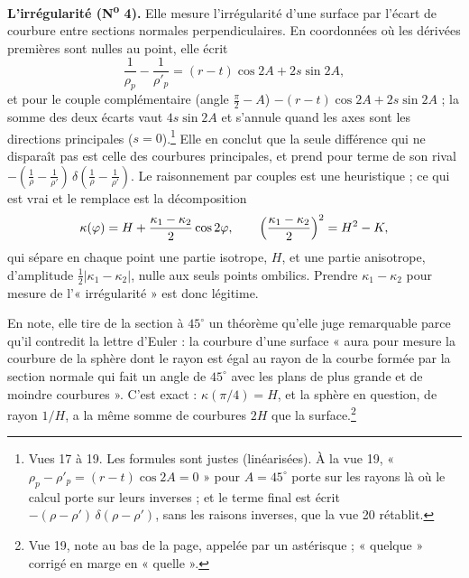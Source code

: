 \documentclass[11pt,a4paper]{article}
\begin{document}
\textbf{L'irrégularité (N\textsuperscript{o} 4).} Elle mesure l'irrégularité
d'une surface par l'écart de courbure entre sections normales perpendiculaires.
En coordonnées où les dérivées premières sont nulles au point, elle écrit
\[
\frac{1}{\rho_p} - \frac{1}{\rho'_p} = (r-t)\cos 2A + 2s\sin 2A ,
\]
et pour le couple complémentaire (angle $\frac\pi2 - A$) $-(r-t)\cos 2A + 2s\sin
2A$ ; la somme des deux écarts vaut $4s\sin 2A$ et s'annule quand les axes
sont les directions principales ($s = 0$).\footnote{Vues 17 à 19. Les formules
sont justes (linéarisées). À la vue 19, « $\rho_p - \rho'_p = (r-t)\cos 2A = 0$ »
pour $A = 45^\circ$ porte sur les rayons là où le calcul porte sur leurs
inverses ; et le terme final est écrit $-(\rho-\rho')\,\delta(\rho-\rho')$, sans
les raisons inverses, que la vue 20 rétablit.} Elle en conclut que la seule
différence qui ne disparaît pas est celle des courbures principales, et prend
pour terme de son rival $-(\frac1\rho - \frac1{\rho'})\,\delta(\frac1\rho -
\frac1{\rho'})$. Le raisonnement par couples est une heuristique ; ce qui est
vrai et le remplace est la décomposition
\[
\kappa(\varphi) = H + \frac{\kappa_1 - \kappa_2}{2}\cos 2\varphi ,
\qquad
\Bigl(\frac{\kappa_1-\kappa_2}{2}\Bigr)^2 = H^2 - K ,
\]
qui sépare en chaque point une partie isotrope, $H$, et une partie
anisotrope, d'amplitude $\frac12|\kappa_1-\kappa_2|$, nulle aux seuls points
ombilics. Prendre $\kappa_1 - \kappa_2$ pour mesure de l'« irrégularité » est
donc légitime.

En note, elle tire de la section à $45^\circ$ un théorème qu'elle juge
remarquable parce qu'il contredit la lettre d'Euler : la courbure d'une surface
« aura pour mesure la courbure de la sphère dont le rayon est égal au rayon de
la courbe formée par la section normale qui fait un angle de $45^\circ$ avec
les plans de plus grande et de moindre courbures ». C'est exact : $\kappa(\pi/4)
= H$, et la sphère en question, de rayon $1/H$, a la même somme de courbures
$2H$ que la surface.\footnote{Vue 19, note au bas de la page, appelée par un
astérisque ; « quelque » corrigé en marge en « quelle ».}
\end{document}
